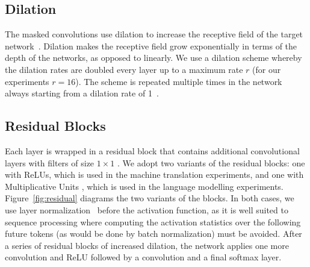 \documentclass{article}
\begin{document}
\subsection{Dilation}
\label{dilation}

The masked convolutions use dilation to increase the receptive field of the target network~\citep{DBLP:journals/corr/ChenPKMY14,DBLP:journals/corr/YuK15}. Dilation makes the receptive field grow exponentially in terms of the depth of the networks, as opposed to linearly.  We use a dilation scheme whereby the dilation rates are doubled every layer up to a maximum rate $r$ (for our experiments $r=16$). The scheme is repeated multiple times in the network always starting from a dilation rate of 1~\citep{wavenet,vpn}. 

\subsection{Residual Blocks}

Each layer is wrapped in a residual block that contains additional convolutional layers with filters of size $1\times1$ \citep{DBLP:journals/corr/HeZR016}. We adopt two variants of the residual blocks: one with ReLUs, which is used in the machine translation experiments, and one with Multiplicative Units \citep{vpn}, which is used in the language modelling experiments. Figure~\ref{fig:residual} diagrams the two variants of the blocks. In both cases, we use layer normalization~\citep{DBLP:journals/corr/BaKH16} before the activation function, as it is well suited to sequence processing where computing the activation statistics over the following future tokens (as would be done by batch normalization) must be avoided.
After a series of residual blocks of increased dilation, the network applies one more convolution  and ReLU followed by a convolution and a final softmax layer.
\end{document}
